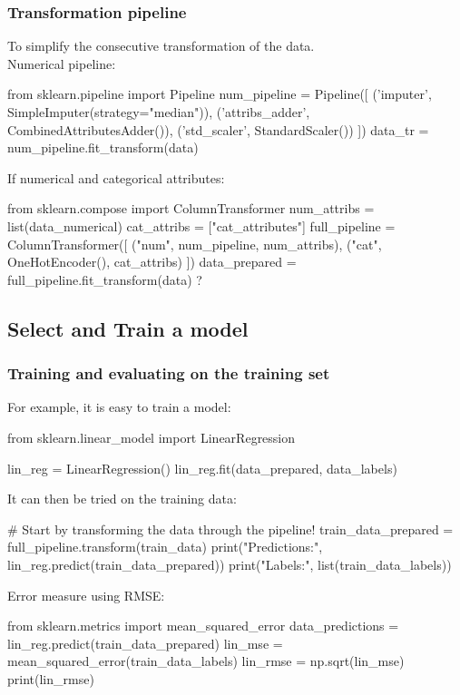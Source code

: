 \documentclass{article}
\begin{document}
    \subsubsection*{Transformation pipeline}
    To simplify the consecutive transformation of the data.\\
    Numerical pipeline:
    \begin{python}
      from sklearn.pipeline import Pipeline
      num_pipeline = Pipeline([
                  ('imputer', SimpleImputer(strategy="median")),
                  ('attribs_adder', CombinedAttributesAdder()),
                  ('std_scaler', StandardScaler())
                  ])
      data_tr = num_pipeline.fit_transform(data)
    \end{python}
    If numerical and categorical attributes:
    \begin{python}
      from sklearn.compose import ColumnTransformer
      num_attribs = list(data_numerical)
      cat_attribs = ["cat_attributes"]
      full_pipeline = ColumnTransformer([
            ("num", num_pipeline, num_attribs),
            ("cat", OneHotEncoder(), cat_attribs)
            ])
      data_prepared = full_pipeline.fit_transform(data)
    ?\end{python}

\subsection{Select and Train a model}
\subsubsection*{Training and evaluating on the training set}
    For example, it is easy to train a model:
    \begin{python}
        from sklearn.linear_model import LinearRegression

        lin_reg = LinearRegression()
        lin_reg.fit(data_prepared, data_labels)
    \end{python}

    It can then be tried on the training data:
    \begin{python}
        # Start by transforming the data through the pipeline!
        train_data_prepared = full_pipeline.transform(train_data)
        print("Predictions:", lin_reg.predict(train_data_prepared))
        print("Labels:", list(train_data_labels))
    \end{python}

    Error measure using RMSE:
    \begin{python}
        from sklearn.metrics import mean_squared_error
        data_predictions = lin_reg.predict(train_data_prepared)
        lin_mse = mean_squared_error(train_data_labels)
        lin_rmse = np.sqrt(lin_mse)
        print(lin_rmse)
    \end{python}
\end{document}
